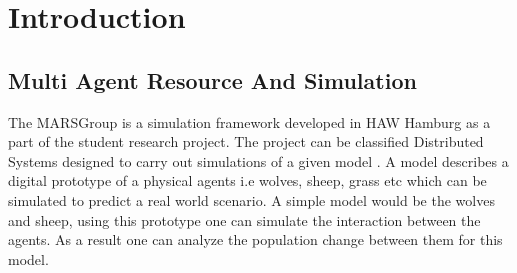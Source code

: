 \newpage
\chapter{Introduction}
    \section{Multi Agent Resource And Simulation}

        The MARS\footnotemark Group is a simulation framework developed 
        in HAW Hamburg as a  part of the student research project. The project can be classified 
        Distributed Systems \cite{DistributedSystems} designed to carry out simulations of a given model 
        \cite{HAWHamburgMARS}. 
        A model describes a digital prototype of a physical agents i.e wolves, sheep, grass etc 
        which can be simulated to predict a real world scenario. A simple model would
        be the wolves and sheep, using this prototype one can simulate the interaction between the agents. 
        As a result one can analyze the population change between them for this model. 

